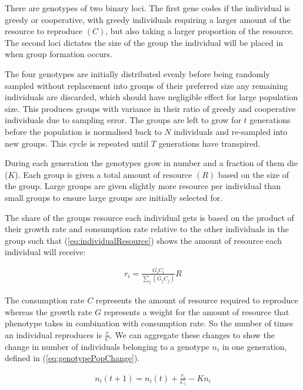 \documentclass[a4paper,10pt, twocolumn]{article}
\begin{document}
There are genotypes of two binary loci. The first gene codes if the individual is greedy or cooperative, with greedy individuals requiring a larger amount of the resource to reproduce $(C)$, but also taking a larger proportion of the resource. The second loci dictates the size of the group the individual will be placed in when group formation occurs.  

The four genotypes are initially distributed evenly before being randomly sampled without replacement into groups of their preferred size any remaining individuals are discarded, which should have negligible effect for large population size. This produces groups with variance in their ratio of greedy and cooperative individuals due to sampling error. The groups are left to grow for $t$ generations before the population is normalised back to $N$ individuals and re-sampled into new groups. This cycle is repeated until $T$ generations have transpired.  

During each generation the genotypes grow in number and a fraction of them die ($K$). Each group is given a total amount of resource $(R)$ based on the size of the group. Large groups are given slightly more resource per individual than small groups to ensure large groups are initially selected for. 

The share of the groups resource each individual gets is based on the product of their growth rate and consumption rate relative to the other individuals in the group such that (\ref{eq:individualResource}) shows the amount of resource each individual will receive: 

\begin{align}
	r_i = \frac{G_iC_i}{\sum_j(G_jC_j)}R
	\label{eq:individualResource}
\end{align}

The consumption rate $C$ represents the amount of resource required to reproduce whereas the growth rate $G$ represents a weight for the amount of resource that phenotype takes in combination with consumption rate. So the number of times an individual reproduces is $\frac{r}{C}$. We can aggregate these changes to show the change in number of individuals belonging to a genotype $n_i$ in one generation, defined in (\ref{eq:genotypePopChange}). 

\begin{align}
	n_i(t+1) = n_i(t) + \frac{r_i}{C_i}- Kn_i
	\label{eq:genotypePopChange}
\end{align}
\end{document}
